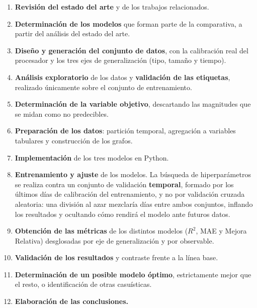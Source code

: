 \begin{enumerate}
    \item \textbf{Revisión del estado del arte} y de los trabajos relacionados.
    \item \textbf{Determinación de los modelos} que forman parte de la comparativa, a partir
          del análisis del estado del arte.
    \item \textbf{Diseño y generación del conjunto de datos}, con la calibración real del
          procesador y los tres ejes de generalización (tipo, tamaño y tiempo).
    \item \textbf{Análisis exploratorio} de los datos y \textbf{validación de las etiquetas},
          realizado únicamente sobre el conjunto de entrenamiento.
    \item \textbf{Determinación de la variable objetivo}, descartando las magnitudes que se
          midan como no predecibles.
    \item \textbf{Preparación de los datos}: partición temporal, agregación a variables
          tabulares y construcción de los grafos.
    \item \textbf{Implementación} de los tres modelos en Python.
    \item \textbf{Entrenamiento y ajuste} de los modelos. La búsqueda de hiperparámetros se
          realiza contra un conjunto de validación \textbf{temporal}, formado por los últimos
          días de calibración del entrenamiento, y no por validación cruzada aleatoria: una división al azar mezclaría días entre ambos conjuntos, inflando los resultados y ocultando cómo rendirá el modelo ante futuros datos.
    \item \textbf{Obtención de las métricas} de los distintos modelos ($R^2$, MAE y Mejora Relativa)
          desglosadas por eje de generalización y por observable.
    \item \textbf{Validación de los resultados} y contraste frente a la línea base.
    \item \textbf{Determinación de un posible modelo óptimo}, estrictamente mejor que el
          resto, o identificación de otras casuísticas.
    \item \textbf{Elaboración de las conclusiones.}
\end{enumerate}

